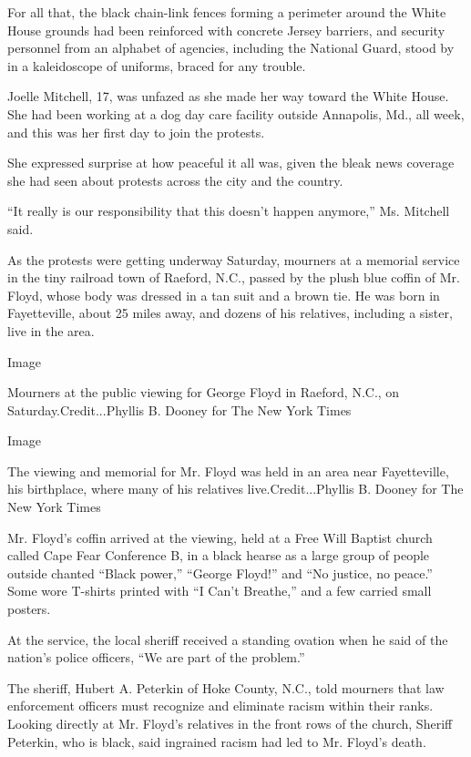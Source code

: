 For all that, the black chain-link fences forming a perimeter around the
White House grounds had been reinforced with concrete Jersey barriers,
and security personnel from an alphabet of agencies, including the
National Guard, stood by in a kaleidoscope of uniforms, braced for any
trouble.

Joelle Mitchell, 17, was unfazed as she made her way toward the White
House. She had been working at a dog day care facility outside
Annapolis, Md., all week, and this was her first day to join the
protests.

She expressed surprise at how peaceful it all was, given the bleak news
coverage she had seen about protests across the city and the country.

``It really is our responsibility that this doesn't happen anymore,''
Ms. Mitchell said.

As the protests were getting underway Saturday, mourners at a memorial
service in the tiny railroad town of Raeford, N.C., passed by the plush
blue coffin of Mr. Floyd, whose body was dressed in a tan suit and a
brown tie. He was born in Fayetteville, about 25 miles away, and dozens
of his relatives, including a sister, live in the area.

Image

Mourners at the public viewing for George Floyd in Raeford, N.C., on
Saturday.Credit...Phyllis B. Dooney for The New York Times

Image

The viewing and memorial for Mr. Floyd was held in an area near
Fayetteville, his birthplace, where many of his relatives
live.Credit...Phyllis B. Dooney for The New York Times

Mr. Floyd's coffin arrived at the viewing, held at a Free Will Baptist
church called Cape Fear Conference B, in a black hearse as a large group
of people outside chanted ``Black power,'' ``George Floyd!'' and ``No
justice, no peace.'' Some wore T-shirts printed with ``I Can't
Breathe,'' and a few carried small posters.

At the service, the local sheriff received a standing ovation when he
said of the nation's police officers, ``We are part of the problem.''

The sheriff, Hubert A. Peterkin of Hoke County, N.C., told mourners that
law enforcement officers must recognize and eliminate racism within
their ranks. Looking directly at Mr. Floyd's relatives in the front rows
of the church, Sheriff Peterkin, who is black, said ingrained racism had
led to Mr. Floyd's death.

